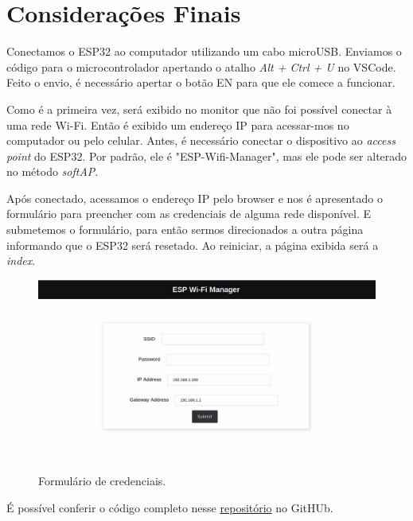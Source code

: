 \section{Considerações Finais}

Conectamos o ESP32 ao computador utilizando um cabo microUSB. Enviamos o código para o microcontrolador apertando o atalho \textit{Alt + Ctrl + U} no VSCode. Feito o envio, é necessário apertar o botão EN para que ele comece a funcionar.

Como é a primeira vez, será exibido no monitor que não foi possível conectar à uma rede Wi-Fi. Então é exibido um endereço IP para acessar-mos no computador ou pelo celular. Antes, é necessário conectar o dispositivo ao \textit{access point} do ESP32. Por padrão, ele é "ESP-Wifi-Manager", mas ele pode ser alterado no método \textit{softAP}.

Após conectado, acessamos o endereço IP pelo browser e nos é apresentado o formulário para preencher com as credenciais de alguma rede disponível. E submetemos o formulário, para então sermos direcionados a outra página informando que o ESP32 será resetado. Ao reiniciar, a página exibida será a \textit{index}.

\begin{figure}[H]
    \centering
    \includegraphics[width=0.5\linewidth]{img/screen.jpg}
    \caption{Formulário de credenciais.}
    \label{fig:credentials}
\end{figure}

É possível conferir o código completo nesse \href{https://github.com/fabricio-araujo94/microcontroladores/tree/main/wifi_manager_}{repositório} no GitHUb.